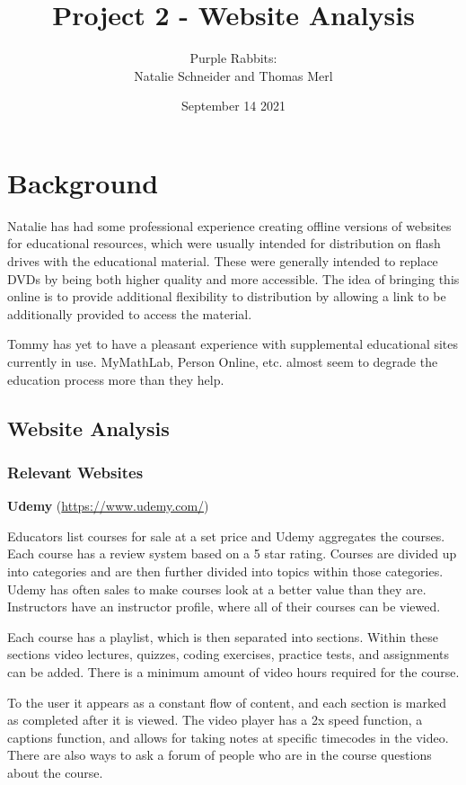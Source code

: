 \documentclass{article}
\title{Project 2 - Website Analysis}
\author{Purple Rabbits:\\Natalie Schneider and Thomas Merl}
\date{September 14 2021}
\begin{document}
\maketitle

\section{Background}

Natalie has had some professional experience creating offline versions of websites for educational resources, which were usually intended for distribution on flash drives with the educational material. These were generally intended to replace DVDs by being both higher quality and more accessible. The idea of bringing this online is to provide additional flexibility to distribution by allowing a link to be additionally provided to access the material.\vspace{\baselineskip}

Tommy has yet to have a pleasant experience with supplemental educational sites currently in use. MyMathLab, Person Online, etc. almost seem to degrade the education process more than they help.

\subsection{Website Analysis}
\subsubsection{Relevant Websites}
    
\textbf{Udemy} (\url{https://www.udemy.com/})

Educators list courses for sale at a set price and Udemy aggregates the courses. Each course has a review system based on a 5 star rating. Courses are divided up into categories and are then further divided into topics within those categories. Udemy has often sales to make courses look at a better value than they are. Instructors have an instructor profile, where all of their courses can be viewed.

Each course has a playlist, which is then separated into sections. Within these sections video lectures, quizzes, coding exercises, practice tests, and assignments can be added. There is a minimum amount of video hours required for the course.

To the user it appears as a constant flow of content, and each section is marked as completed after it is viewed. The video player has a 2x speed function, a captions function, and allows for taking notes at specific timecodes in the video. There are also ways to ask a forum of people who are in the course questions about the course. \vspace{\baselineskip}
\end{document}

